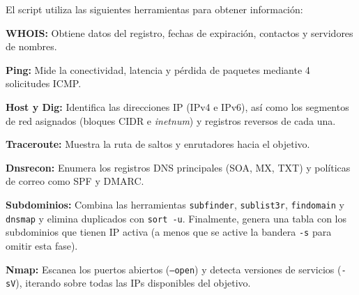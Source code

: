 El script utiliza las siguientes herramientas para obtener información:
\begin{enumerateColor}
    \item \textbf{WHOIS:} Obtiene datos del registro, fechas de expiración, contactos y servidores de nombres.
    \item \textbf{Ping:} Mide la conectividad, latencia y pérdida de paquetes mediante 4 solicitudes ICMP.
    \item \textbf{Host y Dig:} Identifica las direcciones IP (IPv4 e IPv6), así como los segmentos de red asignados (bloques CIDR e \textit{inetnum}) y registros reversos de cada una.
    \item \textbf{Traceroute:} Muestra la ruta de saltos y enrutadores hacia el objetivo.
    \item \textbf{Dnsrecon:} Enumera los registros DNS principales (SOA, MX, TXT) y políticas de correo como SPF y DMARC.
    \item \textbf{Subdominios:} Combina las herramientas \texttt{subfinder}, \texttt{sublist3r}, \texttt{findomain} y \texttt{dnsmap} y elimina duplicados con \texttt{sort -u}. Finalmente, genera una tabla con los subdominios que tienen IP activa (a menos que se active la bandera \texttt{-s} para omitir esta fase).
    \item \textbf{Nmap:} Escanea los puertos abiertos (\texttt{--open}) y detecta versiones de servicios (\texttt{-sV}), iterando sobre todas las IPs disponibles del objetivo.
\end{enumerateColor}
